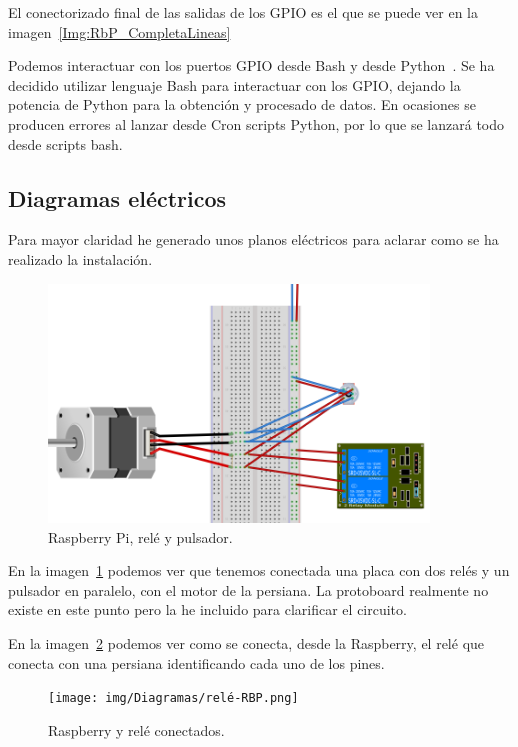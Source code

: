 El conectorizado final de las salidas de los GPIO es el que se puede ver en la imagen~\ref{Img:RbP_CompletaLineas}

Podemos interactuar con los puertos GPIO desde Bash y desde Python~\cite{misc:Python}. Se ha decidido utilizar lenguaje Bash para interactuar con los GPIO, dejando la potencia de Python para la obtención y procesado de datos. En ocasiones se producen errores al lanzar desde Cron scripts Python, por lo que se lanzará todo desde scripts bash.


\subsection{Diagramas eléctricos}
Para mayor claridad he generado unos planos eléctricos para aclarar como se ha realizado la instalación.

\begin{figure}[h]
    \centering
    \includegraphics[width=0.9\textwidth]{img/Diagramas/rele-pulsador-motor.png}
    \caption{Raspberry Pi, relé y pulsador.} \label{Img:Relé+Pulsador+Rbp_Fritzing}
\end{figure}

En la imagen~\ref{Img:Relé+Pulsador+Rbp_Fritzing} podemos ver que tenemos conectada una placa con dos relés y un pulsador en paralelo, con el motor de la persiana. La protoboard realmente no existe en este punto pero la he incluido para clarificar el circuito.

En la imagen~\ref{Img:Relé+Rbp_Fritzing} podemos ver como se conecta, desde la Raspberry, el relé que conecta con una persiana identificando cada uno de los pines.

\begin{figure}[h]
    \centering
    \texttt{[image: img/Diagramas/relé-RBP.png]}
    \caption{Raspberry y relé conectados.} \label{Img:Relé+Rbp_Fritzing}
\end{figure}

